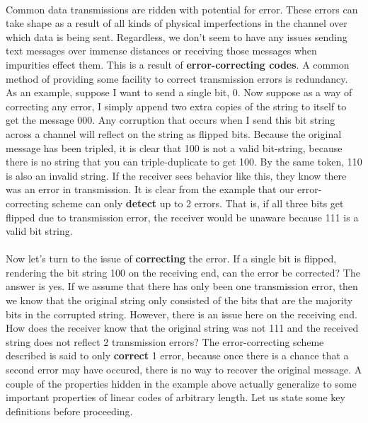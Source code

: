 \documentclass[15pt]{article}
\theoremstyle{definition}
\begin{document}
\paragraph{}
Common data transmissions are ridden with potential for error.  These errors can take shape as a result of all kinds of physical imperfections in the channel over which data is being sent.  Regardless, we don't seem to have any issues sending text messages over immense distances or receiving those messages when impurities effect them.  This is a result of \textbf{error-correcting codes}.  A common method of providing some facility to correct transmission errors is redundancy.  As an example, suppose I want to send a single bit, 0.  Now suppose as a way of correcting any error, I simply append two extra copies of the string to itself to get the message 000.  Any corruption that occurs when I send this bit string across a channel will reflect on the string as flipped bits.  Because the original message has been tripled, it is clear that 100 is not a valid bit-string, because there is no string that you can triple-duplicate to get 100.  By the same token, 110 is also an invalid string.  If the receiver sees behavior like this, they know there was an error in transmission.  It is clear from the example that our error-correcting scheme can only \textbf{detect} up to 2 errors.  That is, if all three bits get flipped due to transmission error, the receiver would be unaware because 111 is a valid bit string.

\paragraph{}
Now let's turn to the issue of \textbf{correcting} the error.  If a single bit is flipped, rendering the bit string 100 on the receiving end, can the error be corrected?  The answer is yes.  If we assume that there has only been one transmission error, then we know that the original string only consisted of the bits that are the majority bits in the corrupted string.  However, there is an issue here on the receiving end.  How does the receiver know that the original string was not 111 and the received string does not reflect 2 transmission errors?  The error-correcting scheme described is said to only \textbf{correct} 1 error, because once there is a chance that a second error may have occured, there is no way to recover the original message. 
\hspace*{8pt} A couple of the properties hidden in the example above actually generalize to some important properties of linear codes of arbitrary length.  Let us state some key definitions before proceeding.        
\end{document}
